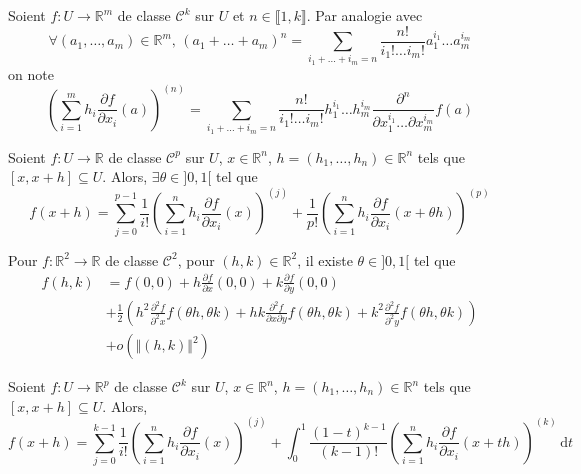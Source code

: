   \begin{notation}
    Soient $f : U \rightarrow \mathbb{R}^m$ de classe $\mathcal{C}^k$ sur $U$ et $n \in \llbracket 1, k \rrbracket$. Par analogie avec
    \[ \forall (a_1, \dots, a_m) \in \mathbb{R}^m, \, (a_1 + \dots + a_m)^n = \sum_{i_1+\dots+i_m=n} \frac{n!}{i_1! \dots i_m!} a_1^{i_1} \dots a_m^{i_m} \]
    on note
    \[ \left( \sum_{i=1}^m h_i \frac{\partial f}{\partial x_i} (a) \right)^{(n)} = \sum_{i_1+\dots+i_m=n} \frac{n!}{i_1! \dots i_m!} h_1^{i_1} \dots h_m^{i_m} \frac{\partial^n}{\partial x_1^{i_1} \dots \partial x_m^{i_m}} f(a) \]
  \end{notation}

  \begin{theorem}
    Soient $f : U \rightarrow \mathbb{R}$ de classe $\mathcal{C}^p$ sur $U$, $x \in \mathbb{R}^n$, $h = (h_1, \dots, h_n) \in \mathbb{R}^n$ tels que $[x,x+h] \subseteq U$. Alors, $\exists \theta \in ]0,1[$ tel que
    \[ f(x+h) = \sum_{j=0}^{p-1} \frac{1}{i!} \left( \sum_{i=1}^n h_i \frac{\partial f}{\partial x_i} (x) \right)^{(j)} + \frac{1}{p!} \left( \sum_{i=1}^n h_i \frac{\partial f}{\partial x_i} (x + \theta h) \right)^{(p)} \]
  \end{theorem}

  \begin{example}
    Pour $f : \mathbb{R}^2 \rightarrow \mathbb{R}$ de classe $\mathcal{C}^2$, pour $(h, k) \in \mathbb{R}^2$, il existe $\theta \in ]0,1[$ tel que
    \begin{align*}
      f(h,k) &= f(0,0) + h \frac{\partial f}{\partial x}(0,0) + k \frac{\partial f}{\partial y}(0,0) \\
      &+ \frac{1}{2} \left( h^2 \frac{\partial^2 f}{\partial^2 x} f(\theta h, \theta k) + hk \frac{\partial^2 f}{\partial x \partial y} f(\theta h, \theta k) + k^2 \frac{\partial^2 f}{\partial^2 y} f(\theta h, \theta k) \right) \\
      &+ o(\Vert (h,k) \Vert^2)
    \end{align*}
  \end{example}

  \begin{theorem}
    Soient $f : U \rightarrow \mathbb{R}^p$ de classe $\mathcal{C}^k$ sur $U$, $x \in \mathbb{R}^n$, $h = (h_1, \dots, h_n) \in \mathbb{R}^n$ tels que $[x,x+h] \subseteq U$. Alors,
    \[ f(x+h) = \sum_{j=0}^{k-1} \frac{1}{i!} \left( \sum_{i=1}^n h_i \frac{\partial f}{\partial x_i} (x) \right)^{(j)} + \int_0^1 \frac{(1-t)^{k-1}}{(k-1)!} \left( \sum_{i=1}^{n} h_i \frac{\partial f}{\partial x_i} (x+th) \right)^{(k)} \, \mathrm{d}t \]
  \end{theorem}

